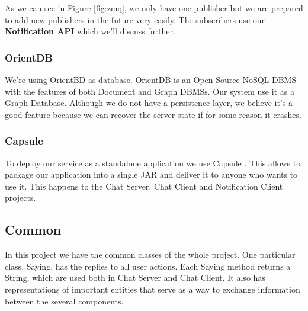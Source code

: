 As we can see in Figure \ref{fig:zmq}, we only have one publisher but we are prepared to add new publishers in the future very easily. The subscribers use our \textbf{Notification API} which we'll discuss further. 



\subsubsection{OrientDB} We're using OrientBD \cite{odb} as database. OrientDB is an Open Source NoSQL DBMS with the features of both Document and Graph DBMSs. Our system use it as a Graph Database. Although we do not have a persistence layer, we believe it's a good feature because we can recover the server state if for some reason it crashes.

\subsubsection{Capsule} To deploy our service as a standalone application we use Capsule \cite{capsule}. This allows to package our application into a single JAR and deliver it to anyone who wants to use it. This happens to the Chat Server, Chat Client and Notification Client projects.





\subsection{Common}
In this project we have the common classes of the whole project. One particular class, Saying, has the replies to all user actions. Each Saying method returns a String, which are used both in Chat Server and Chat Client. It also has representations of important entities that serve as a way to exchange information between the several components.